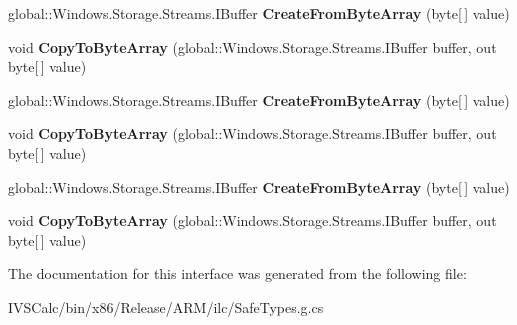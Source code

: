 \begin{DoxyCompactItemize}
\item 
\mbox{\label{interface_windows_1_1_security_1_1_cryptography_1_1_i_cryptographic_buffer_statics_ae1db9a5ea426f69de9bce3add19b97f7}} 
global\+::\+Windows.\+Storage.\+Streams.\+I\+Buffer {\bfseries Create\+From\+Byte\+Array} (byte\mbox{[}$\,$\mbox{]} value)
\item 
\mbox{\label{interface_windows_1_1_security_1_1_cryptography_1_1_i_cryptographic_buffer_statics_af4c54874a2a48fcead29f0fe1352cec5}} 
void {\bfseries Copy\+To\+Byte\+Array} (global\+::\+Windows.\+Storage.\+Streams.\+I\+Buffer buffer, out byte\mbox{[}$\,$\mbox{]} value)
\item 
\mbox{\label{interface_windows_1_1_security_1_1_cryptography_1_1_i_cryptographic_buffer_statics_ae1db9a5ea426f69de9bce3add19b97f7}} 
global\+::\+Windows.\+Storage.\+Streams.\+I\+Buffer {\bfseries Create\+From\+Byte\+Array} (byte\mbox{[}$\,$\mbox{]} value)
\item 
\mbox{\label{interface_windows_1_1_security_1_1_cryptography_1_1_i_cryptographic_buffer_statics_af4c54874a2a48fcead29f0fe1352cec5}} 
void {\bfseries Copy\+To\+Byte\+Array} (global\+::\+Windows.\+Storage.\+Streams.\+I\+Buffer buffer, out byte\mbox{[}$\,$\mbox{]} value)
\item 
\mbox{\label{interface_windows_1_1_security_1_1_cryptography_1_1_i_cryptographic_buffer_statics_ae1db9a5ea426f69de9bce3add19b97f7}} 
global\+::\+Windows.\+Storage.\+Streams.\+I\+Buffer {\bfseries Create\+From\+Byte\+Array} (byte\mbox{[}$\,$\mbox{]} value)
\item 
\mbox{\label{interface_windows_1_1_security_1_1_cryptography_1_1_i_cryptographic_buffer_statics_af4c54874a2a48fcead29f0fe1352cec5}} 
void {\bfseries Copy\+To\+Byte\+Array} (global\+::\+Windows.\+Storage.\+Streams.\+I\+Buffer buffer, out byte\mbox{[}$\,$\mbox{]} value)
\end{DoxyCompactItemize}


The documentation for this interface was generated from the following file\+:\begin{DoxyCompactItemize}
\item 
I\+V\+S\+Calc/bin/x86/\+Release/\+A\+R\+M/ilc/Safe\+Types.\+g.\+cs\end{DoxyCompactItemize}
